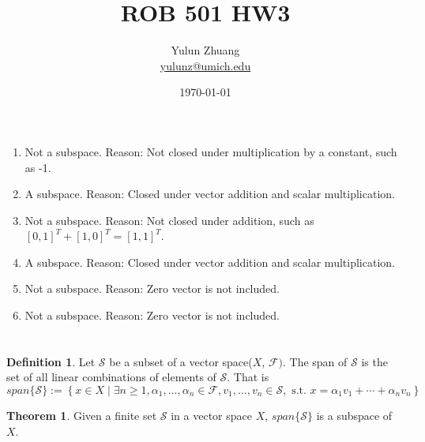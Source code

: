 \documentclass{article}
\title{ROB 501 HW3}
\author{Yulun Zhuang \\ \href{mailto:yulunz@umich.edu}{yulunz@umich.edu}}
\date{\today}
\theoremstyle{definition} %
\newtheorem{definition}{Definition}[section]
\newtheorem{theorem}{Theorem}[section]
\begin{document}
\maketitle

\section{}

\begin{enumerate}[label=(\alph*)]
    \item Not a subspace. Reason: Not closed under multiplication by a constant, such as -1.
    \item A subspace. Reason: Closed under vector addition and scalar multiplication.
    \item Not a subspace. Reason: Not closed under addition, such as $[0, 1]^T + [1, 0]^T = [1, 1]^T$.
    \item A subspace. Reason: Closed under vector addition and scalar multiplication.
    \item Not a subspace. Reason: Zero vector is not included.
    \item Not a subspace. Reason: Zero vector is not included.
\end{enumerate}

\section{}

\begin{definition}
    Let $\mathcal S$ be a subset of a vector space($X$, $\mathcal{F})$. The span of $\mathcal S$ is the set of all linear combinations of elements of $\mathcal S$. That is
    $$span\{\mathcal{S}\}:=\left\{x \in X \mid \exists n \geq 1, \alpha_1, \ldots, \alpha_n \in \mathcal{F}, v_1, \ldots, v_n \in \mathcal{S}, \text { s.t. } x=\alpha_1 v_1+\cdots+\alpha_n v_n\right\}$$
\end{definition}

\begin{theorem}
    Given a finite set $\mathcal S$ in a vector space $X$, $span\{\mathcal S\}$ is a subspace of $X$.
\end{theorem}
\end{document}
